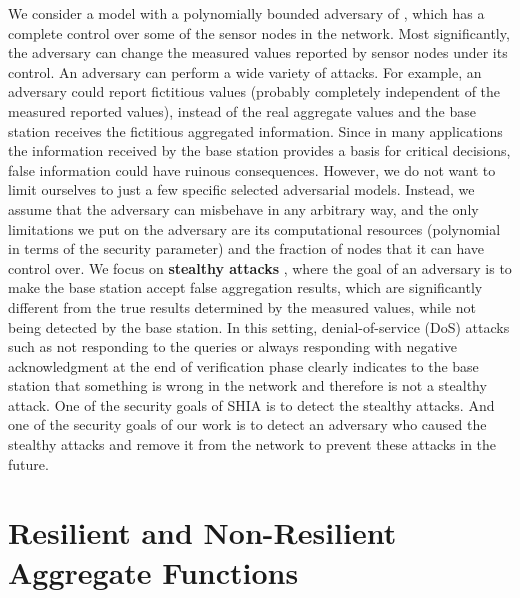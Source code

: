 	We consider a model with a polynomially bounded adversary of \cite{przydatek2003sia}, which has a complete control over some of the sensor nodes in the network.
	Most significantly, the adversary can change the measured values reported by sensor nodes under its control.
	An adversary can perform a wide variety of attacks.
	For example, an adversary could report fictitious values (probably completely independent of the measured reported values), instead of the real aggregate values and the base station receives the fictitious aggregated information. 
	Since in many applications the information received by the base station provides a basis for critical decisions, false information could have ruinous consequences.
	However, we do not want to limit ourselves to just a few specific selected adversarial models. 
	Instead, we assume that the adversary can misbehave in any arbitrary way, and the only limitations we put on the adversary are its computational resources (polynomial in terms of the security parameter) and the fraction of nodes that it can have control over. 
	We focus on \textbf{stealthy attacks} \cite{przydatek2003sia}, where the goal of an adversary is to make the base station accept false aggregation results, which are significantly different from the true results determined by the measured values, while not being detected by the base station.
	In this setting, denial-of-service (DoS) attacks such as not responding to the queries or always responding with negative acknowledgment at the end of verification phase clearly indicates to the base station that something is wrong in the network and therefore is not a stealthy attack.
	One of the security goals of SHIA is to detect the stealthy attacks.
	And one of the security goals of our work is to detect an adversary who caused the stealthy attacks and remove it from the network to prevent these attacks in the future.
	
\section{Resilient and Non-Resilient Aggregate Functions}
	
